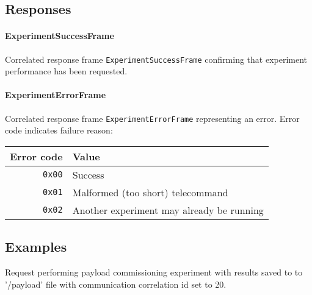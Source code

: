 \subsection{Responses}
\paragraph{ExperimentSuccessFrame}

Correlated response frame \texttt{ExperimentSuccessFrame} confirming 
that \radfet experiment performance has been requested.

\paragraph{ExperimentErrorFrame}
Correlated response frame \texttt{ExperimentErrorFrame} representing an error. 
Error code indicates failure reason:

\begin{tabular}{r | l}
    Error code & Value \\
    \hline
    \texttt{0x00}   & Success \\
    \texttt{0x01}   & Malformed (too short) telecommand \\
    \texttt{0x02}   & Another experiment may already be running \\
\end{tabular}

\subsection{Examples}
Request performing payload commissioning experiment with results saved to 
to '/payload' file with communication correlation id set to 20.


